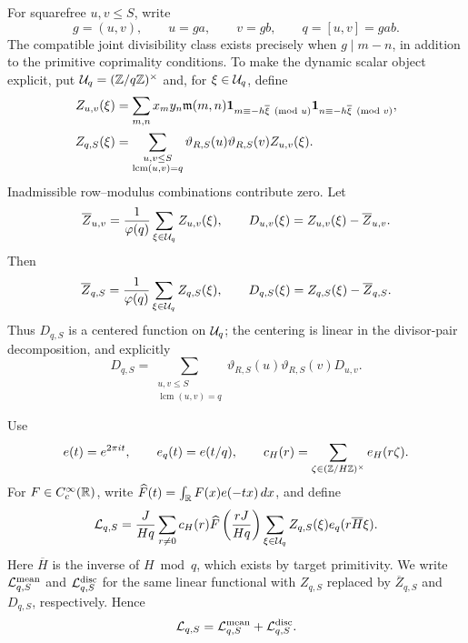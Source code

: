 For squarefree \(u,v\le S\), write
\begin{equation}
 g=(u,v),\qquad u=ga,\qquad v=gb,\qquad
 q=[u,v]=gab.
 \label{eq:gab}
\end{equation}
The compatible joint divisibility class exists precisely when
\(g\mid m-n\), in addition to the primitive coprimality conditions.
To make the dynamic scalar object explicit, put
\(\mathcal U_q=(\mathbb Z/q\mathbb Z)^\times\) and, for \(\xi\in\mathcal U_q\), define
\begin{align}
 Z_{u,v}(\xi)
 &=
 \sum_{m,n}x_my_n\mathfrak m(m,n)
 \mathbf 1_{m\equiv-h\overline{\xi}\pmod{u}}
 \mathbf 1_{n\equiv-h\overline{\xi}\pmod{v}},
 \label{eq:dynamic-pair-fiber}\\
 Z_{q,S}(\xi)
 &=
 \sum_{\substack{u,v\le S\\\operatorname{lcm}(u,v)=q}}
 \vartheta_{R,S}(u)\vartheta_{R,S}(v)Z_{u,v}(\xi).
 \label{eq:dynamic-lcm-fiber}
\end{align}
Inadmissible row--modulus combinations contribute zero.  Let
\begin{equation}
 \overline Z_{u,v}
 =\frac1{\varphi(q)}\sum_{\xi\in\mathcal U_q}Z_{u,v}(\xi),
 \qquad
 D_{u,v}(\xi)=Z_{u,v}(\xi)-\overline Z_{u,v}.
 \label{eq:dynamic-pair-centering}
\end{equation}
Then
\begin{equation}
 \overline Z_{q,S}
 =\frac1{\varphi(q)}\sum_{\xi\in\mathcal U_q}Z_{q,S}(\xi),
 \qquad
 D_{q,S}(\xi)=Z_{q,S}(\xi)-\overline Z_{q,S}.
 \label{eq:dynamic-centering}
\end{equation}
Thus \(D_{q,S}\) is a centered function on \(\mathcal U_q\); the centering is
linear in the divisor-pair decomposition, and explicitly
\begin{equation}
 D_{q,S}
 =
 \sum_{\substack{u,v\le S\\\operatorname{lcm}(u,v)=q}}
 \vartheta_{R,S}(u)\vartheta_{R,S}(v)D_{u,v}.
 \label{eq:dynamic-centered-pair-sum}
\end{equation}

Use
\[
 e(t)=e^{2\pi it},\qquad e_q(t)=e(t/q),\qquad
 c_H(r)=\sum_{\zeta\in(\mathbb Z/H\mathbb Z)^\times}e_H(r\zeta).
\]
For \(F\in C_c^\infty(\mathbb R)\), write
\(\widehat F(t)=\int_\mathbb R F(x)e(-tx)\,dx\), and define
\begin{equation}
 \mathcal L_{q,S}
 =\frac{J}{Hq}\sum_{r\ne0}c_H(r)
 \widehat F\left(\frac{rJ}{Hq}\right)
 \sum_{\xi\in\mathcal U_q}Z_{q,S}(\xi)e_q(r\overline H\xi).
 \label{eq:dynamic-scalar-packet}
\end{equation}
Here \(\overline H\) is the inverse of \(H\bmod q\), which exists by
target primitivity.  We write \(\mathcal L_{q,S}^{\rm mean}\) and
\(\mathcal L_{q,S}^{\rm disc}\) for the same linear functional with
\(Z_{q,S}\) replaced by \(\overline Z_{q,S}\) and \(D_{q,S}\),
respectively.  Hence
\[
 \mathcal L_{q,S}=\mathcal L_{q,S}^{\rm mean}+\mathcal L_{q,S}^{\rm disc}.
\]

